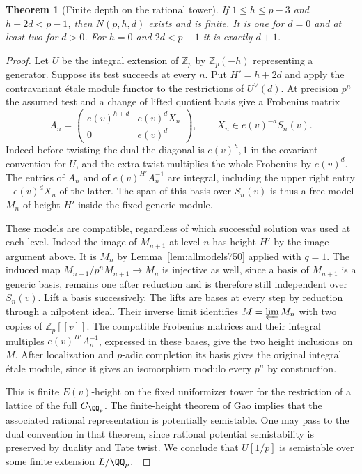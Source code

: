 \documentclass[a4paper,11pt]{article}
\newtheorem{theorem}[proposition]{Theorem}
\theoremstyle{definition}
\theoremstyle{remark}
\numberwithin{equation}{section}
\begin{document}
\begin{theorem}[Finite depth on the rational tower]
\leavevmode\label{thm:finiteobstruction750}
If \(1\le h\le p-3\) and \(h+2d<p-1\), then \(N(p,h,d)\)
exists and is finite. It is one for \(d=0\) and at least two
for \(d>0\). For \(h=0\) and \(2d<p-1\) it is exactly \(d+1\).
\end{theorem}
\begin{proof}
Let \(U\) be the integral extension of \(\mathbb Z_p\) by
\(\mathbb Z_p(-h)\) representing a generator. Suppose its
test succeeds at every \(n\). Put \(H'=h+2d\) and apply the
contravariant \'etale module functor to the restrictions of
\(U^\vee(d)\). At precision \(p^n\) the assumed test and a
change of lifted quotient basis give a Frobenius matrix
\[
 A_n=
 \begin{pmatrix}
       e(v)^{h+d} & e(v)^d X_n\\
            0     & e(v)^d
 \end{pmatrix},\qquad   X_n\in e(v)^{-d}S_n(v).
\]
Indeed before twisting the dual the diagonal is \(e(v)^h,1\)
in the covariant convention for \(U\), and the extra twist
multiplies the whole Frobenius by \(e(v)^d\). The entries of
\(A_n\) and of \(e(v)^{H'}A_n^{-1}\) are integral, including
the upper right entry \(-e(v)^dX_n\) of the latter. The span
of this basis over \(S_n(v)\) is thus a free model \(M_n\) of
height \(H'\) inside the fixed generic module.

These models are compatible, regardless of which successful
solution was used at each level. Indeed the image of \(M_{n+1}\)
at level \(n\) has height \(H'\) by the image argument above.
It is \(M_n\) by Lemma~\ref{lem:allmodels750} applied with
\(q=1\). The induced map \(M_{n+1}/p^nM_{n+1}\to M_n\)
is injective as well, since a basis of \(M_{n+1}\) is a
generic basis, remains one after reduction and is therefore
still independent over \(S_n(v)\). Lift a basis successively.
The lifts are bases at every step by reduction through a nilpotent
ideal. Their inverse limit identifies \(M=\varprojlim M_n\)
with two copies of \(\mathbb Z_p[[v]]\). The compatible
Frobenius matrices and their integral multiples
\(e(v)^{H'}A_n^{-1}\), expressed in these bases, give the two
height inclusions on \(M\). After localization and \(p\)-adic
completion its basis gives the original integral \'etale module, since it gives an isomorphism modulo every \(p^n\) by construction.

This is finite \(E(v)\)-height on the fixed uniformizer tower
for the restriction of a lattice of the full \(G_{\QQ_p}\).
The finite-height theorem of Gao implies that the associated
rational representation is potentially semistable. One may
pass to the dual convention in that theorem, since rational
potential semistability is preserved by duality and Tate twist.
We conclude that \(U[1/p]\) is semistable over some finite
extension \(L/\QQ_p\).~\cite[Theorem~1.1.16]{III-II-gaofinite750}


\end{proof}
\end{document}
